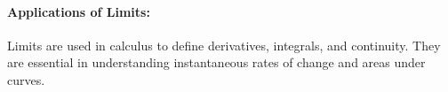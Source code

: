 \documentclass[a4paper,12pt]{book}
\begin{document}
\begin{comment}

\paragraph{Graphical Representation:}
The following graph illustrates the concept using a function \( f(x) \) and a point \( a \).

\begin{tikzpicture}
\begin{axis}[
    axis lines = middle,
    xlabel = \( x \),
    ylabel = {\( f(x) \)},
    xmin=0, xmax=5,
    ymin=0, ymax=10,
    legend pos=north west,
    ymajorgrids=true,
    grid style=dashed,
    samples=100
]

\def\a{3}
\def\L{3.5}
\def\delta{0.5} %
\def\epsilon{0.5} %

\draw[dashed, color=blue] (axis cs:\a-\delta,0) -- (axis cs:\a-\delta,\L);
\draw[dashed, color=blue] (axis cs:\a+\delta,0) -- (axis cs:\a+\delta,\L);
\draw[dashed, color=red] (axis cs:0,\L+\epsilon) -- (axis cs:\a,\L+\epsilon);
\draw[dashed, color=red] (axis cs:0,\L-\epsilon) -- (axis cs:\a,\L-\epsilon);

\node[label={above right:\( a-\delta \)},circle,fill,inner sep=2pt] at (axis cs:\a-\delta,{(\a-\delta)^2/4 + 2}) {};
\node[label={above right:\( a+\delta \)},circle,fill,inner sep=2pt] at (axis cs:\a+\delta,{(\a+\delta)^2/4 + 2}) {};
\node[label={left:\( L+\epsilon \)},circle,fill,inner sep=2pt] at (axis cs:0,\L+\epsilon) {};
\node[label={left:\( L-\epsilon \)},circle,fill,inner sep=2pt] at (axis cs:0,\L-\epsilon) {};

\addplot[domain=0:5, color=blue, ultra thick]{x^2/4 + 2};
\addlegendentry{\( f(x) \)}
\end{axis}
\end{tikzpicture}

\end{comment}



\paragraph{Applications of Limits:}
Limits are used in calculus to define derivatives, integrals, and continuity. They are essential in understanding instantaneous rates of change and areas under curves.
\end{document}
